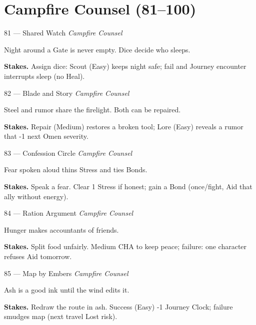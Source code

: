 \section{Campfire Counsel (81--100)}

\begin{encounterentry}{81 --- Shared Watch}
\textit{Campfire Counsel}

Night around a Gate is never empty. Dice decide who sleeps.

\textbf{Stakes.} Assign dice: Scout (Easy) keeps night safe; fail and Journey encounter interrupts sleep (no Heal).
\end{encounterentry}

\begin{encounterentry}{82 --- Blade and Story}
\textit{Campfire Counsel}

Steel and rumor share the firelight. Both can be repaired.

\textbf{Stakes.} Repair (Medium) restores a broken tool; Lore (Easy) reveals a rumor that -1 next Omen severity.
\end{encounterentry}

\begin{encounterentry}{83 --- Confession Circle}
\textit{Campfire Counsel}

Fear spoken aloud thins Stress and ties Bonds.

\textbf{Stakes.} Speak a fear. Clear 1 Stress if honest; gain a Bond (once/fight, Aid that ally without energy).
\end{encounterentry}

\begin{encounterentry}{84 --- Ration Argument}
\textit{Campfire Counsel}

Hunger makes accountants of friends.

\textbf{Stakes.} Split food unfairly. Medium CHA to keep peace; failure: one character refuses Aid tomorrow.
\end{encounterentry}

\begin{encounterentry}{85 --- Map by Embers}
\textit{Campfire Counsel}

Ash is a good ink until the wind edits it.

\textbf{Stakes.} Redraw the route in ash. Success (Easy) -1 Journey Clock; failure smudges map (next travel Lost risk).
\end{encounterentry}

